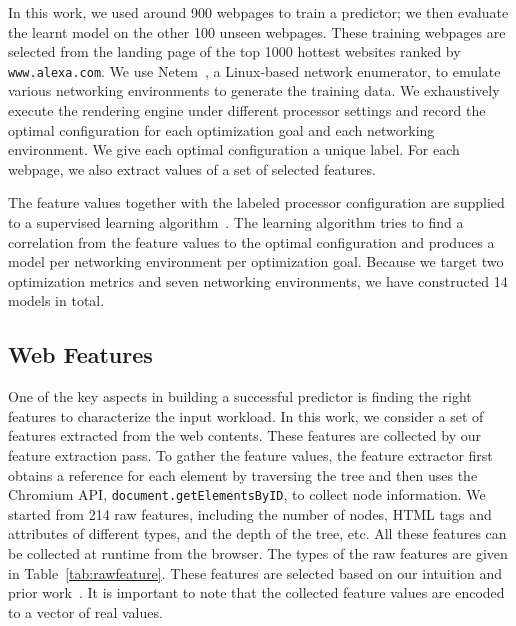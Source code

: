 In this work, we used around 900 webpages to train a \SVM predictor; we then evaluate the learnt model on the other 100 unseen webpages.
These training webpages are selected from the landing page of the top 1000 hottest websites ranked by \texttt{www.alexa.com}. We use Netem~\cite{hemminger2005network}, a Linux-based network enumerator, to emulate
various networking environments to generate the training data. We exhaustively execute the rendering
engine under different processor settings and record the optimal configuration for each optimization goal and each networking environment.
We give each optimal configuration a unique label. For each webpage, we also extract values of a set of selected features.


 The feature values together with the labeled processor configuration are supplied to a supervised learning
algorithm~\cite{kotsiantis2007supervised}. The learning algorithm tries to find a correlation from the feature values to the optimal
configuration and produces a \SVM model per networking environment per optimization goal. Because we target two optimization metrics and
seven networking environments, we have constructed 14 \SVM models in total. 

\subsection{Web Features \label{sec:web_features}}
One of the key aspects in building a successful predictor is finding the right features to characterize the input workload. In this work,
we consider a set of features extracted from the web contents. These features are collected by our feature extraction pass. To gather the
feature values, the feature extractor  first obtains a reference for each \DOM element by traversing the \DOM tree and then uses the
Chromium API, \texttt{document.getElementsByID}, to collect node information. We started from 214 raw features, including the number of
\DOM nodes, HTML tags and attributes of different types, and the depth of the \DOM tree, etc. All these features can be collected at
runtime from the browser. The types of the raw features are given in Table~\ref{tab:rawfeature}. These features are selected based
on our intuition and prior work~\cite{ren2016optimise,nejati2016depth,asrese2016wepr}.
It is important to note that the
collected feature values are encoded to a vector of real values.



